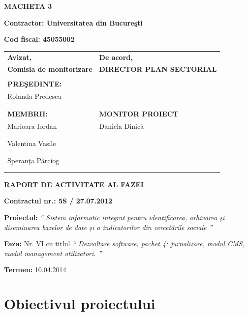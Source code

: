 \documentclass[a4paper, 10pt]{article}
\title{}
\author{}
\date{2013-04-08}
\begin{document}
{\raggedleft\bfseries
MACHETA 3
\par}

{\bfseries
Contractor: Universitatea din Bucure\c{s}ti}

{\textbf{Cod fiscal: 45055002}

\bigskip


\begin{tabular}{@{}l l}
\textbf{Avizat,}&\textbf{De acord,}\\
\textbf{Comisia de monitorizare}&\textbf{DIRECTOR PLAN SECTORIAL}\\
\\
\textbf{PRE\c{S}EDINTE:}&\\
Rolanda Predescu&\\
\\
\\
\textbf{MEMBRII:}&\textbf{MONITOR PROIECT}\\
Marioara Iordan&Daniela Dinic\u{a}\\
\\
\\
Valentina Vasile&\\
\\
\\
Speran\c{t}a P\^{a}rciog\\
\\
\\
\end{tabular}

\bigskip

\bigskip

{\centering\bfseries
RAPORT DE ACTIVITATE AL FAZEI
\par}

\bigskip

{\bfseries
Contractul nr.: 5S / 27.07.2012}

{
\textbf{Proiectul: }
\textit{`` Sistem informatic integrat pentru identificarea, arhivarea \c{s}i diseminarea bazelor de date \c{s}i a indicatorilor din
cercet\u{a}rile sociale ''}}

{
\textbf{Faza: }
Nr. VI cu titlul
\textit{`` Dezvoltare software, pachet 4: jurnalizare, modul CMS, modul management utilizatori. ''}}

{\textbf{Termen:} 10.04.2014}

\medskip

\section{Obiectivul proiectului}

}
\end{document}
